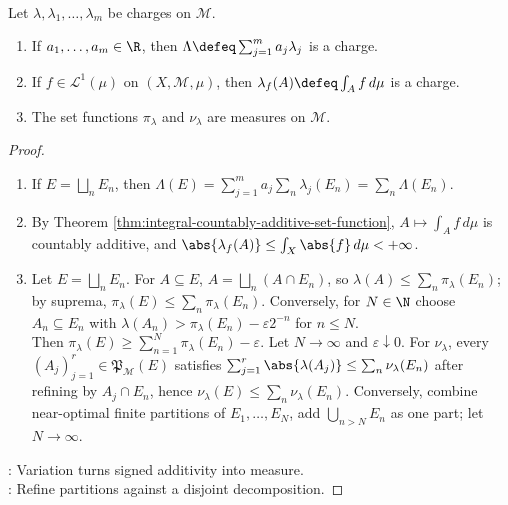 \begin{proposition} \label{prop:charges-linear-combinations-and-variation} \\
Let $\lambda,\lambda_1,\ldots,\lambda_m$ be charges on $\mathcal{M}$.
\begin{enumerate}[label=(\roman*)]
\setlength{\itemsep}{0pt}
\item If $a_1,\ldots,a_m\in\R$, then $\Lambda\defeq\sum_{j=1}^{m}a_j\lambda_j$ is a charge.
\item If $f\in\mathscr{L}^1(\mu)$ on $(X,\mathcal{M},\mu)$, then $\lambda_f(A)\defeq\int_A f\,d\mu$ is a charge.
\item The set functions $\pi_\lambda$ and $\nu_\lambda$ are measures on $\mathcal{M}$.
\end{enumerate}
\begin{proof}
\begin{enumerate}[label=(\roman*)]
\setlength{\itemsep}{0pt}
\item If $E=\bigsqcup_nE_n$, then $\Lambda(E)=\sum_{j=1}^{m}a_j\sum_n\lambda_j(E_n)=\sum_n\Lambda(E_n)$.
\item By Theorem \ref{thm:integral-countably-additive-set-function}, $A\mapsto\int_A f\,d\mu$ is countably additive, and $\abs{\lambda_f(A)}\leq\int_X\abs{f}\,d\mu<+\infty$.
\item Let $E=\bigsqcup_nE_n$. For $A\subseteq E$, $A=\bigsqcup_n(A\cap E_n)$, so $\lambda(A)\leq\sum_n\pi_\lambda(E_n)$; by suprema, $\pi_\lambda(E)\leq\sum_n\pi_\lambda(E_n)$. Conversely, for $N\in\N$ choose $A_n\subseteq E_n$ with $\lambda(A_n)>\pi_\lambda(E_n)-\varepsilon2^{-n}$ for $n\leq N$.\\
Then $\pi_\lambda(E)\geq\sum_{n=1}^{N}\pi_\lambda(E_n)-\varepsilon$. Let $N\to\infty$ and $\varepsilon\downarrow0$. For $\nu_\lambda$, every $(A_j)_{j=1}^{r}\in\mathfrak{P}_{\mathcal{M}}(E)$ satisfies $\sum_{j=1}^{r}\abs{\lambda(A_j)}\leq\sum_n\nu_\lambda(E_n)$ after refining by $A_j\cap E_n$, hence $\nu_\lambda(E)\leq\sum_n\nu_\lambda(E_n)$. Conversely, combine near-optimal finite partitions of $E_1,\ldots,E_N$, add $\bigcup_{n>N}E_n$ as one part; let $N\to\infty$.
\end{enumerate}
: Variation turns signed additivity into measure.\\
: Refine partitions against a disjoint decomposition.
\end{proof}
\end{proposition}

